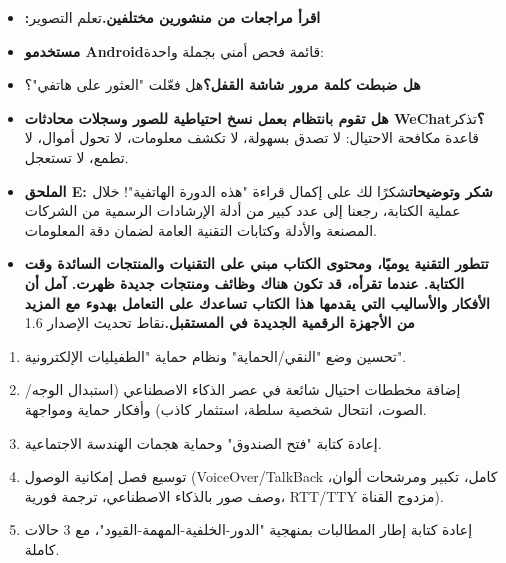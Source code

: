 

\begin{itemize}
  \item \textbf{:اقرأ مراجعات من منشورين مختلفين.}تعلم التصوير
  \item \textbf{مستخدمو Android}قائمة فحص أمني بجملة واحدة:
  \item \textbf{هل ضبطت كلمة مرور شاشة القفل؟}هل فعّلت "العثور على هاتفي"؟
\end{itemize}


\begin{itemize}
  \item \textbf{هل تقوم بانتظام بعمل نسخ احتياطية للصور وسجلات محادثات WeChat؟}تذكر قاعدة مكافحة الاحتيال: لا تصدق بسهولة، لا تكشف معلومات، لا تحول أموال، لا تطمع، لا تستعجل.
  \item \textbf{الملحق E: شكر وتوضيحات}شكرًا لك على إكمال قراءة "هذه الدورة الهاتفية"! خلال عملية الكتابة، رجعنا إلى عدد كبير من أدلة الإرشادات الرسمية من الشركات المصنعة والأدلة وكتابات التقنية العامة لضمان دقة المعلومات.
  \item \textbf{تتطور التقنية يوميًا، ومحتوى الكتاب مبني على التقنيات والمنتجات السائدة وقت الكتابة. عندما تقرأه، قد تكون هناك وظائف ومنتجات جديدة ظهرت. آمل أن الأفكار والأساليب التي يقدمها هذا الكتاب تساعدك على التعامل بهدوء مع المزيد من الأجهزة الرقمية الجديدة في المستقبل.}نقاط تحديث الإصدار 1.6
\end{itemize}


\begin{enumerate}
  \item تحسين وضع "النقي/الحماية" ونظام حماية "الطفيليات الإلكترونية".
  \item إضافة مخططات احتيال شائعة في عصر الذكاء الاصطناعي (استبدال الوجه/الصوت، انتحال شخصية سلطة، استثمار كاذب) وأفكار حماية ومواجهة.
  \item إعادة كتابة "فتح الصندوق" وحماية هجمات الهندسة الاجتماعية.
  \item توسيع فصل إمكانية الوصول (VoiceOver/TalkBack كامل، تكبير ومرشحات ألوان، وصف صور بالذكاء الاصطناعي، ترجمة فورية، RTT/TTY مزدوج القناة).
  \item إعادة كتابة إطار المطالبات بمنهجية "الدور-الخلفية-المهمة-القيود"، مع 3 حالات كاملة.
\end{enumerate}
